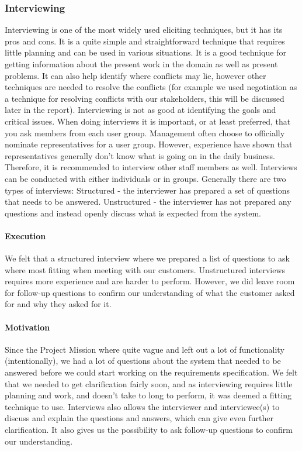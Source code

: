 \documentclass[10pt]{article}
\begin{document}
\subsubsection{Interviewing}
Interviewing is one of the most widely used eliciting techniques, but it has its pros and cons. It is a quite simple and straightforward technique that requires little planning and can be used in various situations. It is a good technique for getting information about the present work in the domain as well as present problems. It can also help identify where conflicts may lie, however other techniques are needed to resolve the conflicts (for example we used negotiation as a technique for resolving conflicts with our stakeholders, this will be discussed later in the report). Interviewing is not as good at identifying the goals and critical issues.
When doing interviews it is important, or at least preferred, that you ask members from each user group. Management often choose to officially nominate representatives for a user group. However, experience have shown that representatives generally don’t know what is going on in the daily business. Therefore, it is recommended to interview other staff members as well. Interviews can be conducted with either individuals or in groups.
Generally there are two types of interviews: 
Structured -  the interviewer has prepared a set of questions that needs to be answered. 
Unstructured - the interviewer has not prepared any questions and instead openly discuss what is expected from the system. 
\paragraph{Execution}
\hfill \break
We felt that a structured interview where we prepared a list of questions to ask where most fitting when meeting with our customers. Unstructured interviews requires more experience and are harder to perform. However, we did leave room for follow-up questions to confirm our understanding of what the customer asked for and why they asked for it. 
\paragraph{Motivation}
\hfill \break
Since the Project Mission where quite vague and left out a lot of functionality (intentionally), we had a lot of questions about the system that needed to be answered before we could start working on the requirements specification. We felt that we needed to get clarification fairly soon, and as interviewing requires little planning and work, and doesn’t take to long to perform, it was deemed a fitting technique to use. Interviews also allows the interviewer and interviewee(s) to discuss and explain the questions and answers, which can give even further clarification. It also gives us the possibility to ask follow-up questions to confirm our understanding. 
\end{document}
